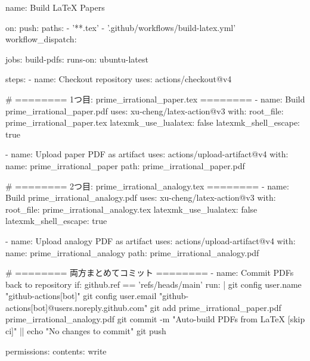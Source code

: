 name: Build LaTeX Papers

on:
  push:
    paths:
      - '**.tex'
      - '.github/workflows/build-latex.yml'
  workflow_dispatch:

jobs:
  build-pdfs:
    runs-on: ubuntu-latest

    steps:
      - name: Checkout repository
        uses: actions/checkout@v4

      # ======== 1つ目: prime_irrational_paper.tex ========
      - name: Build prime_irrational_paper.pdf
        uses: xu-cheng/latex-action@v3
        with:
          root_file: prime_irrational_paper.tex
          latexmk_use_lualatex: false
          latexmk_shell_escape: true

      - name: Upload paper PDF as artifact
        uses: actions/upload-artifact@v4
        with:
          name: prime_irrational_paper
          path: prime_irrational_paper.pdf

      # ======== 2つ目: prime_irrational_analogy.tex ========
      - name: Build prime_irrational_analogy.pdf
        uses: xu-cheng/latex-action@v3
        with:
          root_file: prime_irrational_analogy.tex
          latexmk_use_lualatex: false
          latexmk_shell_escape: true

      - name: Upload analogy PDF as artifact
        uses: actions/upload-artifact@v4
        with:
          name: prime_irrational_analogy
          path: prime_irrational_analogy.pdf

      # ======== 両方まとめてコミット ========
      - name: Commit PDFs back to repository
        if: github.ref == 'refs/heads/main'
        run: |
          git config user.name "github-actions[bot]"
          git config user.email "github-actions[bot]@users.noreply.github.com"
          git add prime_irrational_paper.pdf prime_irrational_analogy.pdf
          git commit -m "Auto-build PDFs from LaTeX [skip ci]" || echo "No changes to commit"
          git push

permissions:
  contents: write